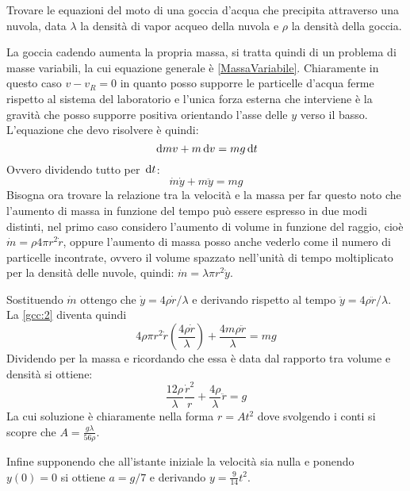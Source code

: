 \documentclass[../main.tex]{subfiles}
\begin{document}

\textex
Trovare le equazioni del moto di una goccia d'acqua che precipita attraverso una nuvola, data $\lambda$ la densità di vapor acqueo della nuvola e $\rho$
la densità della goccia.

\solution

La goccia cadendo aumenta la propria massa, si tratta quindi di un problema di masse variabili, la cui equazione generale è \cref{MassaVariabile}.
Chiaramente in questo caso $v-v_{R}=0$ in quanto posso supporre le particelle d'acqua ferme rispetto al sistema del laboratorio e
l'unica forza esterna che interviene è la gravità che posso supporre positiva orientando l'asse delle $y$ verso il basso.
L'equazione che devo risolvere è quindi:
\begin{equation*}\label{gcc:1}
\,\mathrm{d} mv+m\,\mathrm{d} v=mg\,\mathrm{d} t 
\end{equation*}
Ovvero dividendo tutto per $\,\mathrm{d} t$:
\begin{equation}\label{gcc:2}
 \dot{m}\dot{y}+m\ddot{y}=mg
\end{equation}
Bisogna ora trovare la relazione tra la velocità e la massa per far questo noto che l'aumento di massa in funzione del tempo può essere espresso in due modi distinti,
nel primo caso considero l'aumento di volume in funzione del raggio, cioè $\dot{m}=\rho 4 \pi r^2 \dot{r}$, oppure l'aumento di massa posso anche vederlo
come il numero di particelle incontrate, ovvero il volume spazzato nell'unità di tempo moltiplicato per la densità delle nuvole, quindi:
$\dot{m}=\lambda \pi r^2 \dot{y}$. 

Sostituendo $\dot{m}$ ottengo che $\dot{y}=4\rho \dot{r}/{\lambda}$ e derivando rispetto al tempo $\ddot{y}=4\rho \ddot{r}/\lambda$. La \cref{gcc:2} diventa quindi
\begin{equation*}\label{gcc:3}
 4\rho \pi r^2 \dot{r} (\frac{4 \rho \dot{r}}{\lambda})+\frac{4m\rho \ddot{r}}{\lambda}=mg
\end{equation*}
Dividendo per la massa e ricordando che essa è data dal rapporto tra volume e densità si ottiene:
\begin{equation*}\label{gcc:4}
 \frac{12\rho}{\lambda}\frac{\dot{r}^2}{r}+\frac{4\rho}{\lambda}\ddot{r}=g
\end{equation*}
La cui soluzione è chiaramente nella forma $r=At^2$ dove svolgendo i conti si scopre che $A=\frac{g \lambda}{56 \rho}$.

Infine supponendo che all'istante iniziale la velocità sia nulla e ponendo $y(0)=0$ si ottiene $a=g/7$ e derivando $y=\frac{9}{14}t^2$.
\end{document}
